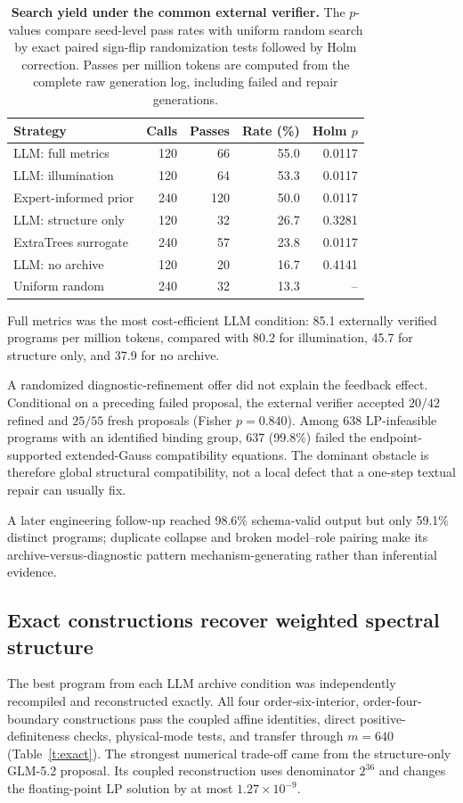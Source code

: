 \documentclass[lineno,pdflatex,sn-nature]{sn-jnl}
\theoremstyle{thmstyleone}
\begin{document}
\begin{table}[!htbp]
\caption{\textbf{Search yield under the common external verifier.} The $p$-values compare seed-level pass rates with uniform random search by exact paired sign-flip randomization tests followed by Holm correction. Passes per million tokens are computed from the complete raw generation log, including failed and repair generations.}
\label{t:yield}
\centering
\small
\begin{tabular}{@{}lrrrr@{}}
\toprule
Strategy & Calls & Passes & Rate (\%) & Holm $p$ \\
\midrule
LLM: full metrics & 120 & 66 & 55.0 & 0.0117 \\
LLM: illumination & 120 & 64 & 53.3 & 0.0117 \\
Expert-informed prior & 240 & 120 & 50.0 & 0.0117 \\
LLM: structure only & 120 & 32 & 26.7 & 0.3281 \\
ExtraTrees surrogate & 240 & 57 & 23.8 & 0.0117 \\
LLM: no archive & 120 & 20 & 16.7 & 0.4141 \\
Uniform random & 240 & 32 & 13.3 & -- \\
\bottomrule
\end{tabular}

\vspace{4pt}
\footnotesize Full metrics was the most cost-efficient LLM condition: 85.1 externally verified programs per million tokens, compared with 80.2 for illumination, 45.7 for structure only, and 37.9 for no archive.
\end{table}

A randomized diagnostic-refinement offer did not explain the feedback effect. Conditional on a preceding failed proposal, the external verifier accepted $20/42$ refined and $25/55$ fresh proposals (Fisher $p=0.840$). Among 638 LP-infeasible programs with an identified binding group, 637 (99.8\%) failed the endpoint-supported extended-Gauss compatibility equations. The dominant obstacle is therefore global structural compatibility, not a local defect that a one-step textual repair can usually fix.

A later engineering follow-up reached 98.6\% schema-valid output but only 59.1\% distinct programs; duplicate collapse and broken model--role pairing make its archive-versus-diagnostic pattern mechanism-generating rather than inferential evidence.

\subsection{Exact constructions recover weighted spectral structure}
The best program from each LLM archive condition was independently recompiled and reconstructed exactly. All four order-six-interior, order-four-boundary constructions pass the coupled affine identities, direct positive-definiteness checks, physical-mode tests, and transfer through $m=640$ (Table~\ref{t:exact}). The strongest numerical trade-off came from the structure-only GLM-5.2 proposal. Its coupled reconstruction uses denominator $2^{36}$ and changes the floating-point LP solution by at most $1.27\times10^{-9}$.
\end{document}
